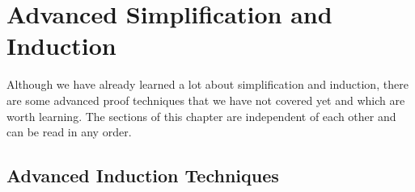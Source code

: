 \chapter{Advanced Simplification and Induction}

Although we have already learned a lot about simplification and
induction, there are some advanced proof techniques that we have not covered
yet and which are worth learning. The sections of this chapter are
independent of each other and can be read in any order.



\section{Advanced Induction Techniques}
\label{sec:advanced-ind}




%

%
%
%
%
%
%
%
%
